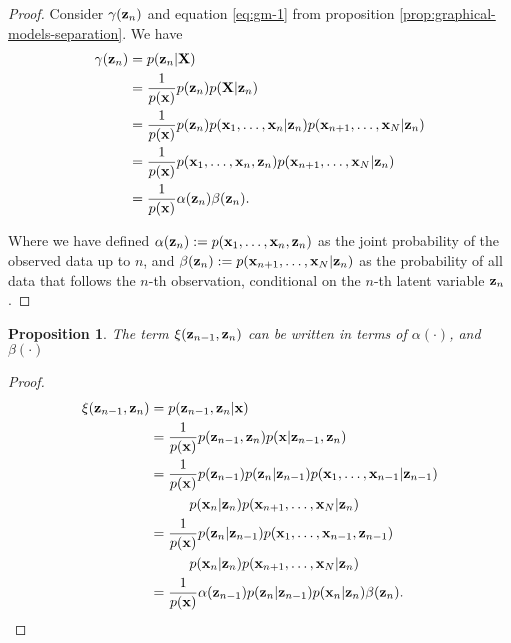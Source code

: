 \documentclass[11pt]{article}
\numberwithin{equation}{section}
\newcommand{\x}{{\bf x}}
\newcommand{\z}{{\bf z}}
\newtheorem{proposition}{Proposition}[section]
\begin{document}
\begin{proof}
Consider  $\gamma(\z_n)$ and equation \eqref{eq:gm-1} from proposition \ref{prop:graphical-models-separation}. We have
\begin{align}
	\gamma(\z_n) &= p(\z_n \vert {\bf X})\\
					  &= \frac{1}{p(\x)}p(\z_n)p({\bf X} \vert \z_n)\\
					  &= \frac{1}{p(\x)} p(\z_n) p(\x_1, \ldots, \x_n\vert \z_n) p(\x_{n+1}, \ldots, \x_N\vert \z_n)\\
					  &= \frac{1}{p(\x)}p(\x_1, \ldots, \x_n, \z_n) p(\x_{n+1}, \ldots, \x_N\vert \z_n)\\
					  &= \frac{1}{p(\x)}\alpha(\z_n)\beta(\z_n).
\end{align}

Where we have defined $\alpha(\z_n) := p(\x_1, \ldots, \x_n, \z_n)$ as the joint probability of the observed data up to $n$, and $\beta(\z_n) := p(\x_{n+1}, \ldots, \x_N\vert \z_n)$ as the probability of all data that follows the $n$-th observation, conditional on the $n$-th latent variable $\z_n$.
\end{proof}


\begin{proposition}\label{prop:xi-factorisation}
	The term $\xi(\z_{n-1}, \z_n)$ can be written in terms of $\alpha({\cdot})$, and $\beta(\cdot)$
\end{proposition}

\begin{proof}
	\begin{align}
		\xi(\z_{n-1}, \z_{n}) &= p(\z_{n-1}, \z_{n} \vert \x)\\
		&= \frac{1}{p(\x)}p(\z_{n-1}, \z_{n}) p(\x \vert \z_{n-1}, \z_{n})\\
		&= \frac{1}{p(\x)} p(\z_{n-1}) p(\z_{n} \vert \z_{n-1}) p(\x_1, \ldots, \x_{n-1}\vert \z_{n-1}) \nonumber \\
			&\hspace{1cm} p(\x_n\vert \z_n) p(\x_{n+1}, \ldots, \x_N \vert \z_n)\\
		&= \frac{1}{p(\x)} p(\z_{n} \vert \z_{n-1}) p(\x_1, \ldots, \x_{n-1}, \z_{n-1}) \nonumber \\
			&\hspace{1cm} p(\x_n\vert \z_n) p(\x_{n+1}, \ldots, \x_N \vert \z_n)\\
		&= \frac{1}{p(\x)} \alpha(\z_{n-1}) p(\z_{n} \vert \z_{n-1}) p(\x_n \vert \z_n) \beta(\z_n).
	\end{align}
\end{proof}
\end{document}
